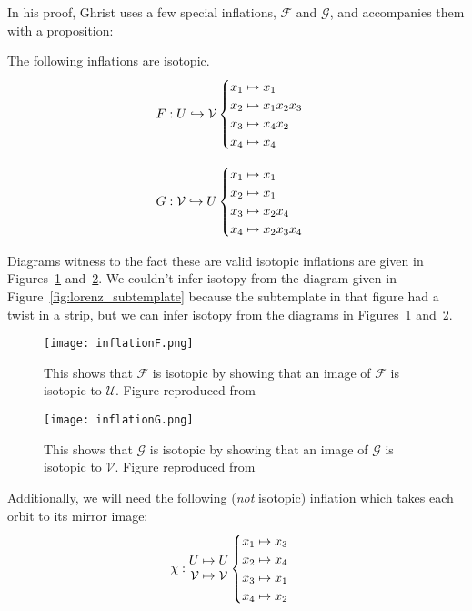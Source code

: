 \documentclass[paper.tex]{subfiles}
\begin{document}
In his proof, Ghrist uses a few special inflations, $\mathcal{F}$ and $\mathcal{G}$, and accompanies them with a proposition:

\begin{prop}
    The following inflations are isotopic.
$$F: U \hookrightarrow \mathcal{V} \begin{cases} x_1 \mapsto x_1 \\ x_2 \mapsto x_1 x_2 x_3 \\ x_3 \mapsto x_4 x_2 \\ x_4 \mapsto x_4 \end{cases}$$

$$G: \mathcal{V} \hookrightarrow U \begin{cases} x_1 \mapsto x_1 \\ x_2 \mapsto x_1 \\ x_3 \mapsto x_2 x_4 \\ x_4 \mapsto x_2 x_3 x_4 \end{cases}$$
\end{prop}

Diagrams witness to the fact these are valid isotopic inflations are given in Figures~\ref{fig:isotopicF} and~\ref{fig:isotopicG}. We couldn't infer isotopy from the diagram given in Figure~\ref{fig:lorenz_subtemplate}
because the subtemplate in that figure had a twist in a strip, but we can infer isotopy from the diagrams in Figures~\ref{fig:isotopicF} and~\ref{fig:isotopicG}.


\begin{figure}[h]
  \centering
  \texttt{[image: inflationF.png]}
  \caption{This shows that $\mathcal{F}$ is isotopic by showing that an image of $\mathcal{F}$ is isotopic to $\mathcal{U}$. Figure reproduced from~\cite{ghs1997}}\label{fig:isotopicF}
\end{figure}

\begin{figure}[h]
  \centering
  \texttt{[image: inflationG.png]}
  \caption{This shows that $\mathcal{G}$ is isotopic by showing that an image of $\mathcal{G}$ is isotopic to $\mathcal{V}$.  Figure reproduced from~\cite{ghs1997}}\label{fig:isotopicG}
\end{figure}


Additionally, we will need the following (\emph{not} isotopic) inflation which takes each orbit to its mirror image: $$\chi: \begin{matrix} U \mapsto U \\ \mathcal{V} \mapsto \mathcal{V} \end{matrix} \begin{cases} x_1 \mapsto x_3 \\ x_2 \mapsto x_4 \\ x_3 \mapsto x_1 \\ x_4 \mapsto x_2 \end{cases}$$
\end{document}
